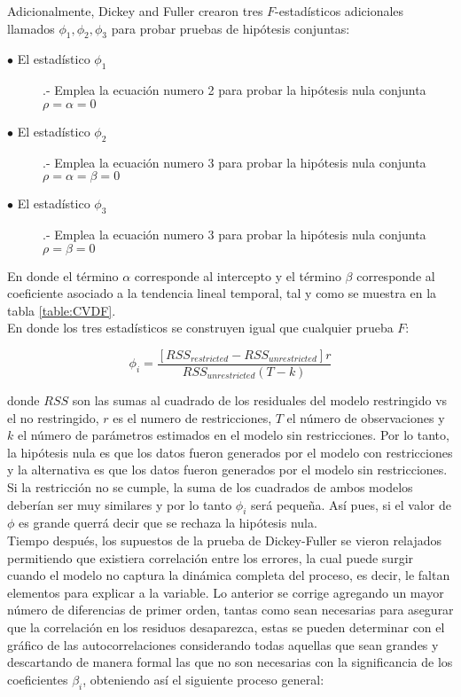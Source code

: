 Adicionalmente, Dickey and Fuller crearon tres $F$-estadísticos adicionales llamados $\phi_1,\phi_2,\phi_3$ para probar pruebas de hipótesis conjuntas:

\begin{description}
  \item [$\bullet$ El estadístico $\phi_1$] .- Emplea la ecuación numero 2 para probar la hipótesis nula conjunta $\rho=\alpha=0$
  \item [$\bullet$ El estadístico $\phi_2$] .- Emplea la ecuación numero 3 para probar la hipótesis nula conjunta $\rho=\alpha=\beta=0$
  \item [$\bullet$ El estadístico $\phi_3$] .- Emplea la ecuación numero 3 para probar la hipótesis nula conjunta $\rho=\beta=0$
\end{description}

En donde el término $\alpha$ corresponde al intercepto y el término $\beta$ corresponde al coeficiente asociado a la tendencia lineal temporal, tal y como se muestra en la tabla \ref{table:CVDF}.\\


En donde los tres estadísticos se construyen igual que cualquier prueba $F$:

$$ \phi_i = \frac{[RSS_{restricted}-RSS_{unrestricted}]r}{RSS_{unrestricted}(T-k)}$$

donde $RSS$ son las sumas al cuadrado de los residuales del modelo restringido vs el no restringido, $r$ es el numero de restricciones, $T$ el número de observaciones y $k$ el número de parámetros estimados en el modelo sin restricciones. Por lo tanto, la hipótesis nula es que los datos fueron generados por el modelo con restricciones y la alternativa es que los datos fueron generados por el modelo sin restricciones. Si la restricción no se cumple, la suma de los cuadrados de ambos modelos deberían ser muy similares y por lo tanto $\phi_i$ será pequeña. Así pues, si el valor de $\phi$ es grande querrá decir que se rechaza la hipótesis nula.\\


Tiempo después, los supuestos de la prueba de Dickey-Fuller se vieron relajados permitiendo que existiera correlación entre los errores, la cual puede surgir cuando el modelo no captura la dinámica completa del proceso, es decir, le faltan elementos para explicar a la variable. Lo anterior se corrige agregando un mayor número de diferencias de primer orden, tantas como sean necesarias para asegurar que la correlación en los residuos desaparezca, estas  se pueden determinar con el gráfico de las autocorrelaciones considerando todas aquellas que sean grandes y descartando de manera formal las que no son necesarias con la significancia de los coeficientes  $\beta_i$, obteniendo así el siguiente proceso general:

